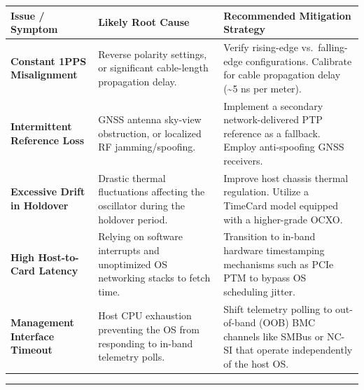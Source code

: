 {\def\LTcaptype{none} %
\begin{longtable}[]{@{}
  >{\raggedright\arraybackslash}p{}
  >{\raggedright\arraybackslash}p{}
  >{\raggedright\arraybackslash}p{}@{}}
\toprule\noalign{}
\begin{minipage}[b]{\linewidth}\raggedright
Issue / Symptom
\end{minipage} & \begin{minipage}[b]{\linewidth}\raggedright
Likely Root Cause
\end{minipage} & \begin{minipage}[b]{\linewidth}\raggedright
Recommended Mitigation Strategy
\end{minipage} \\
\midrule\noalign{}
\endhead
\bottomrule\noalign{}
\endlastfoot
\textbf{Constant 1PPS Misalignment} & Reverse polarity settings, or
significant cable-length propagation delay. & Verify rising-edge
vs.~falling-edge configurations. Calibrate for cable propagation delay
(\textasciitilde5 ns per meter). \\
\textbf{Intermittent Reference Loss} & GNSS antenna sky-view
obstruction, or localized RF jamming/spoofing. & Implement a secondary
network-delivered PTP reference as a fallback. Employ anti-spoofing GNSS
receivers. \\
\textbf{Excessive Drift in Holdover} & Drastic thermal fluctuations
affecting the oscillator during the holdover period. & Improve host
chassis thermal regulation. Utilize a TimeCard model equipped with a
higher-grade OCXO. \\
\textbf{High Host-to-Card Latency} & Relying on software interrupts and
unoptimized OS networking stacks to fetch time. & Transition to in-band
hardware timestamping mechanisms such as PCIe PTM to bypass OS
scheduling jitter. \\
\textbf{Management Interface Timeout} & Host CPU exhaustion preventing
the OS from responding to in-band telemetry polls. & Shift telemetry
polling to out-of-band (OOB) BMC channels like SMBus or NC-SI that
operate independently of the host OS. \\
\end{longtable}
}

\begin{center}\rule{0.5\linewidth}{0.5pt}\end{center}

